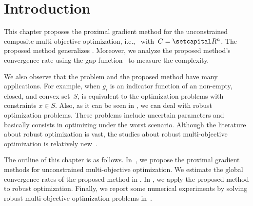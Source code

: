 \documentclass[../main]{subfiles}
\begin{document}
\section{Introduction} 
This chapter proposes the proximal gradient method for the unconstrained composite multi-objective optimization, i.e.,~ with~$C = \setR^n$.
The proposed method generalizes .
Moreover, we analyze the proposed method's convergence rate using the gap function~ to measure the complexity.

We also observe that the problem and the proposed method have many applications. For example, when $g_i$ is an indicator function of an non-empty, closed, and convex set~$S$,  is equivalent to the optimization problems with constraints $x \in S$. Also, as it can be seen in , we can deal with robust optimization problems. These problems include uncertain parameters and basically consists in optimizing under the worst scenario. Although the literature about robust optimization is vast, the studies about robust multi-objective optimization is relatively new~\cite{Ehrgott2014,Fliege2014,Morishita2016}.

The outline of this chapter is as follows.
In~, we propose the proximal gradient methods for unconstrained multi-objective optimization.
We estimate the global convergence rates of the proposed method in .
In , we apply the proposed method to robust optimization.
Finally, we report some numerical experiments by solving robust multi-objective optimization problems in~.
\end{document}

